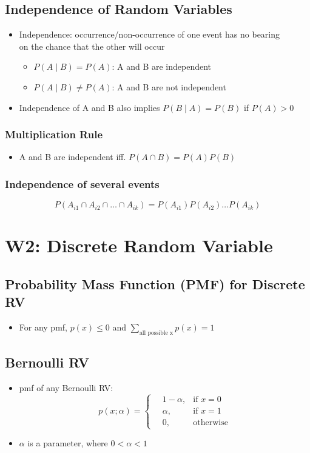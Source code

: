 \documentclass[a4paper]{article}
\begin{document}
\subsection{Independence of Random Variables}
\begin{itemize}
    \item Independence: occurrence/non-occurrence of one event has no bearing\\ on the chance that the other will occur
    \begin{itemize}[label=$\circ$]
        \item $P(A\mid B) = P(A)$: A and B are independent
        \item $P(A\mid B) \neq P(A)$: A and B are not independent
    \end{itemize}
    \item Independence of A and B also implies $P(B\mid A) = P(B)$ if $P(A) > 0$
\end{itemize}
\subsubsection{Multiplication Rule}
\begin{itemize}
    \item A and B are independent iff. $P(A\cap B) = P(A)P(B)$
\end{itemize}
\subsubsection{Independence of several events}
    $$P(A_{i1}\cap A_{i2}\cap\ldots\cap A_{ik}) = P(A_{i1})P(A_{i2})\ldots P(A_{ik})$$
\newpage
\section{W2: Discrete Random Variable}
\subsection{Probability Mass Function (PMF) for Discrete RV}
\begin{itemize}
    \item For any pmf, $p(x)\leq 0$ and $\sum_{\text{all possible x}}p(x) = 1$
\end{itemize}
\subsection{Bernoulli RV}
\begin{itemize}
    \item pmf of any Bernoulli RV:
    $$p(x; \alpha) = \begin{cases}
    \quad 1-\alpha,&\mbox{if }x = 0\\
    \quad \alpha,&\mbox{if }x = 1\\
    \quad 0, &\mbox{otherwise}
    \end{cases}
    $$
    \item $\alpha$ is a parameter, where $0<\alpha<1$
\end{itemize}
\end{document}
